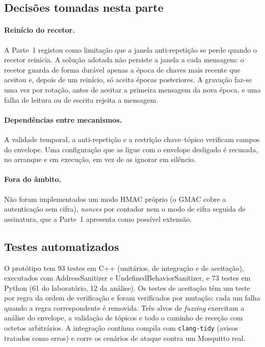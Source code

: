 \subsection{Decisões tomadas nesta parte}

\paragraph{Reinício do recetor.} A Parte~1 registou como limitação que a janela
anti-repetição se perde quando o recetor reinicia. A solução adotada não persiste a
janela a cada mensagem: o recetor guarda de forma durável apenas a época de chaves
mais recente que aceitou e, depois de um reinício, só aceita épocas posteriores. A
gravação faz-se uma vez por rotação, antes de aceitar a primeira mensagem da nova
época, e uma falha de leitura ou de escrita rejeita a mensagem.

\paragraph{Dependências entre mecanismos.} A validade temporal, a anti-repetição
e a restrição chave--tópico verificam campos do envelope. Uma configuração que as
ligue com o envelope desligado é recusada, no arranque e em execução, em vez de as
ignorar em silêncio.

\paragraph{Fora do âmbito.} Não foram implementados um modo HMAC próprio (o GMAC
cobre a autenticação sem cifra), \emph{nonces} por contador nem o modo de cifra
seguida de assinatura, que a Parte~1 apresenta como possível extensão.

\subsection{Testes automatizados}

O protótipo tem 93 testes em C++
(unitários, de integração e de aceitação), executados com AddressSanitizer e
UndefinedBehaviorSanitizer, e 73 testes em Python (61 do laboratório, 12 da
análise). Os testes de aceitação têm um
teste por regra da ordem de verificação e foram verificados por mutação: cada um
falha quando a regra correspondente é removida. Três alvos de \emph{fuzzing}
exercitam a análise do envelope, a validação de tópicos e todo o caminho de
receção com octetos arbitrários. A integração contínua compila com
\texttt{clang-tidy} (avisos tratados como erros) e corre os cenários de ataque
contra um Mosquitto real.
